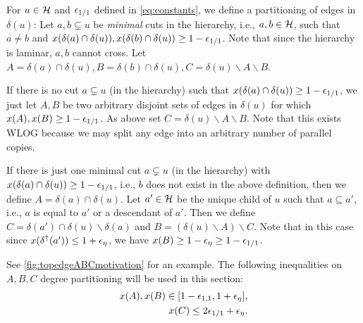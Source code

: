 \begin{definition}\label{def:abcdegpartitioning}
\hypertarget{tar:degreepartition}{For $u\in\mathcal{H}$ and ${\epsilon}_{1/1}$ defined in \ref{eq:constants}, we define a partitioning of edges in $\delta(u)$: Let $a,b\subsetneq u$ be {\em minimal} cuts in the hierarchy, i.e., $a,b\in\mathcal{H}$, such that $a\neq b$  and $x(\delta(a)\cap\delta(u)),x(\delta(b)\cap\delta(u))\geq 1-{\epsilon}_{1/1}$. Note that since the hierarchy is laminar, $a,b$ cannot cross. Let $A=\delta(a)\cap\delta(u),B=\delta(b)\cap\delta(u),C=\delta(u)\smallsetminus A\smallsetminus B$. }

If there is no cut $a\subsetneq u$ (in the hierarchy) such that $x(\delta(a)\cap\delta(u))\geq 1-{\epsilon}_{1/1}$, we just let $A,B$ be two arbitrary disjoint sets of edges in $\delta(u)$ for which $x(A),x(B)\geq 1-{\epsilon}_{1/1}$. As above set $C=\delta(u)\smallsetminus A\smallsetminus B$. Note that this exists WLOG because we may split any edge into an arbitrary number of parallel copies.

If there is just one minimal cut $a\subsetneq u$ (in the hierarchy) with $x(\delta(a)\cap\delta(u))\geq 1-{\epsilon}_{1/1}$, i.e., $b$ does not exist in the above definition, then we define $A=\delta(a)\cap\delta(u)$. Let $a'\in\mathcal{H}$ be the unique child of $u$ such that $a\subseteq a'$, i.e., $a$ is equal to $a'$ or a descendant of $a'$. Then we define $C=\delta(a')\cap\delta(u) \smallsetminus \delta(a)$ and $B=(\delta(u)\smallsetminus A) \smallsetminus C$.
Note that in this case since $x(\delta^\uparrow(a'))\leq 1+{\epsilon}_{\eta}$, we have $x(B)\geq 1-{\epsilon}_\eta\geq 1-{\epsilon}_{1/1}$.
\end{definition}
See \cref{fig:topedgeABCmotivation} for an example.  The following inequalities on $A,B,C$ degree partitioning will be used in this section:
\begin{equation}	
\begin{aligned}
	x(A),x(B) \in [1-{\epsilon}_{1,1},1+{\epsilon}_\eta],\\
	x(C)\leq 2{\epsilon}_{1/1}+{\epsilon}_\eta. 
\end{aligned}\label{eq:ABCDegParx}
\end{equation}

